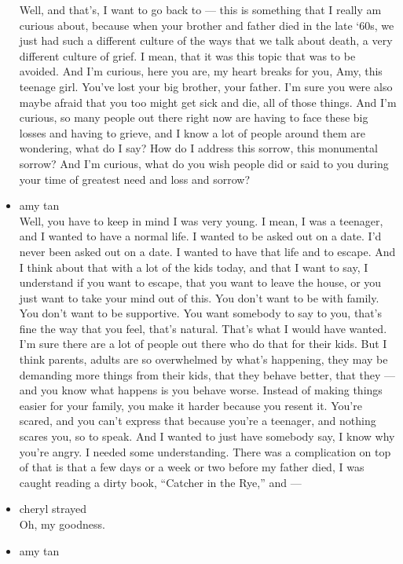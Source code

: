 \begin{itemize}
  Well, and that's, I want to go back to --- this is something that I
  really am curious about, because when your brother and father died in
  the late `60s, we just had such a different culture of the ways that
  we talk about death, a very different culture of grief. I mean, that
  it was this topic that was to be avoided. And I'm curious, here you
  are, my heart breaks for you, Amy, this teenage girl. You've lost your
  big brother, your father. I'm sure you were also maybe afraid that you
  too might get sick and die, all of those things. And I'm curious, so
  many people out there right now are having to face these big losses
  and having to grieve, and I know a lot of people around them are
  wondering, what do I say? How do I address this sorrow, this
  monumental sorrow? And I'm curious, what do you wish people did or
  said to you during your time of greatest need and loss and sorrow?
\item
  amy tan\\
  Well, you have to keep in mind I was very young. I mean, I was a
  teenager, and I wanted to have a normal life. I wanted to be asked out
  on a date. I'd never been asked out on a date. I wanted to have that
  life and to escape. And I think about that with a lot of the kids
  today, and that I want to say, I understand if you want to escape,
  that you want to leave the house, or you just want to take your mind
  out of this. You don't want to be with family. You don't want to be
  supportive. You want somebody to say to you, that's fine the way that
  you feel, that's natural. That's what I would have wanted. I'm sure
  there are a lot of people out there who do that for their kids. But I
  think parents, adults are so overwhelmed by what's happening, they may
  be demanding more things from their kids, that they behave better,
  that they --- and you know what happens is you behave worse. Instead
  of making things easier for your family, you make it harder because
  you resent it. You're scared, and you can't express that because
  you're a teenager, and nothing scares you, so to speak. And I wanted
  to just have somebody say, I know why you're angry. I needed some
  understanding. There was a complication on top of that is that a few
  days or a week or two before my father died, I was caught reading a
  dirty book, ``Catcher in the Rye,'' and ---
\item
  cheryl strayed\\
  Oh, my goodness.
\item
  amy tan\\

\end{itemize}
